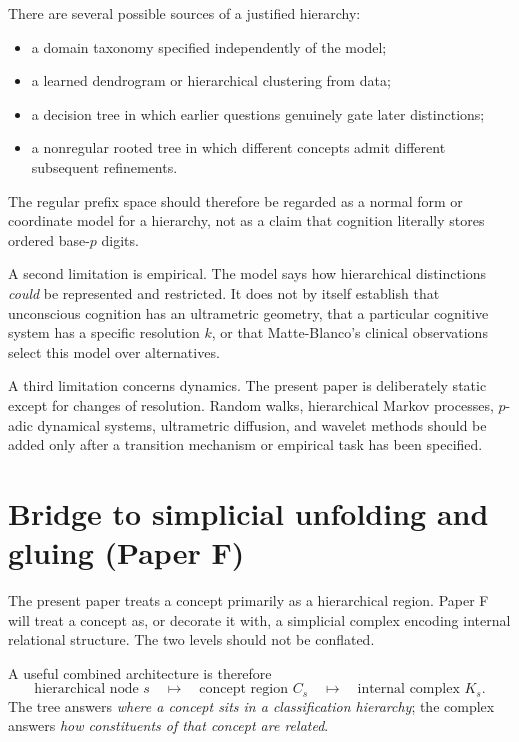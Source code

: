 \documentclass[11pt]{article}
\theoremstyle{definition}
\theoremstyle{remark}
\newcommand{\cyl}[1]{C_{#1}}
\begin{document}
There are several possible sources of a justified hierarchy:
\begin{itemize}
\item a domain taxonomy specified independently of the model;
\item a learned dendrogram or hierarchical clustering from data;
\item a decision tree in which earlier questions genuinely gate later distinctions;
\item a nonregular rooted tree in which different concepts admit different subsequent refinements.
\end{itemize}
The regular prefix space should therefore be regarded as a normal form or coordinate model for a hierarchy, not as a claim that cognition literally stores ordered base-$p$ digits.

A second limitation is empirical.  The model says how hierarchical distinctions \emph{could} be represented and restricted.  It does not by itself establish that unconscious cognition has an ultrametric geometry, that a particular cognitive system has a specific resolution $k$, or that Matte-Blanco's clinical observations select this model over alternatives.

A third limitation concerns dynamics.  The present paper is deliberately static except for changes of resolution.  Random walks, hierarchical Markov processes, $p$-adic dynamical systems, ultrametric diffusion, and wavelet methods should be added only after a transition mechanism or empirical task has been specified.

\section{Bridge to simplicial unfolding and gluing (Paper F)}

The present paper treats a concept primarily as a hierarchical region.  Paper F will treat a concept as, or decorate it with, a simplicial complex encoding internal relational structure.  The two levels should not be conflated.

A useful combined architecture is therefore
\[
\text{hierarchical node }s
\quad\longmapsto\quad
\text{concept region }\cyl{s}
\quad\longmapsto\quad
\text{internal complex }K_s.
\]
The tree answers \emph{where a concept sits in a classification hierarchy}; the complex answers \emph{how constituents of that concept are related}.
\end{document}
